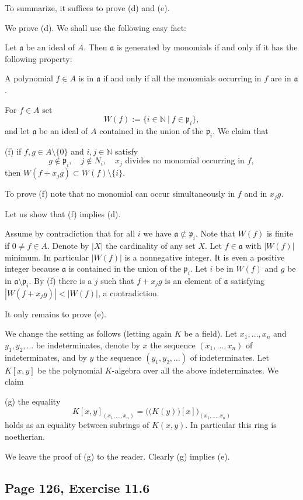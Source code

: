 \documentclass[parskip=half,fontsize=12pt]{scrartcl}%
\newcommand{\mf}{\mathfrak}
\newcommand{\aaa}{\mf a}
\newcommand{\ppp}{\mf p}
\begin{document}
To summarize, it suffices to prove (d) and (e). 

We prove (d). We shall use the following easy fact: 

Let $\aaa$ be an ideal of $A$. Then $\aaa$ is generated by monomials if and only if it has the following property:

A polynomial $f\in A$ is in $\aaa$ if and only if all the monomials occurring in $f$ are in $\aaa$.

For $f\in A$ set 
$$
W(f):=\{i\in\mathbb N\ |\ f\in\ppp_i\},
$$ 
and let $\aaa$ be an ideal of $A$ contained in the union of the $\ppp_i$. %
We claim that 

(f) if $f,g\in A\setminus\{0\}$ and $i,j\in\mathbb N$ satisfy 
$$
g\notin\ppp_i,\quad j\notin N_i,\quad x_j\text{ divides no monomial occurring in }f,
$$ 
then $W(f+x_jg)\subset W(f)\setminus\{i\}$. %

To prove (f) note that no monomial can occur simultaneously in $f$ and in $x_jg$. 

Let us show that (f) implies (d). 

Assume by contradiction that for all $i$ we have $\aaa\not\subset\ppp_i$. Note that $W(f)$ is finite if $0\ne f\in A$. Denote by $|X|$ the cardinality of any set $X$. Let $f\in\aaa$ with $|W(f)|$ minimum. In particular $|W(f)|$ is a nonnegative integer. It is even a positive integer because $\aaa$ is contained in the union of the $\ppp_i$. Let $i$ be in $W(f)$ and $g$ be in $\aaa\setminus\ppp_i$. By (f) there is a $j$ such that $f+x_jg$ is an element of $\aaa$ satisfying $|W(f+x_jg)|<|W(f)|$, a contradiction. 

It only remains to prove (e). 

We change the setting as follows (letting again $K$ be a field). Let $x_1,\ldots,x_n$ and $y_1,y_2,\ldots$ be indeterminates, denote by $x$ the sequence $(x_1,\ldots,x_n)$ of indeterminates, and by $y$ the sequence $(y_1,y_2,\ldots)$ of indeterminates. Let $K[x,y]$ be the polynomial $K$-algebra over all the above indeterminates. We claim 

(g) the equality 
$$
K[x,y]_{(x_1,\ldots,x_n)}=\Big(\big(K(y)\big)[x]\Big)_{(x_1,\ldots,x_n)}
$$ 
holds as an equality between subrings of $K(x,y)$. In particular this ring is noetherian. 

We leave the proof of (g) to the reader. Clearly (g) implies (e).  

\subsection{Page 126, Exercise 11.6}\label{116}%
\end{document}

